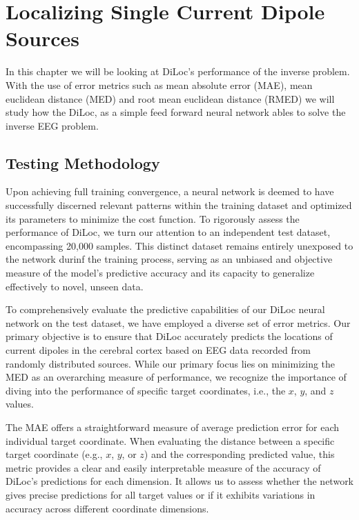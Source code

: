 \documentclass[a4paper, UKenglish, 11pt]{uiomaster}
\begin{document}
\chapter{Localizing Single Current Dipole Sources}

In this chapter we will be looking at DiLoc's performance of the inverse problem. With the use of error metrics such as mean absolute error (MAE), mean euclidean distance (MED) and root mean euclidean distance (RMED) we will study how the DiLoc, as a simple feed forward neural network ables to solve the inverse EEG problem.


\section{Testing Methodology}
Upon achieving full training convergence, a neural network is deemed to have successfully discerned relevant patterns within the training dataset and optimized its parameters to minimize the cost function. To rigorously assess the performance of DiLoc, we turn our attention to an independent test dataset, encompassing 20,000 samples. This distinct dataset remains entirely unexposed to the network durinf the training process, serving as an unbiased and objective measure of the model's predictive accuracy and its capacity to generalize effectively to novel, unseen data.

To comprehensively evaluate the predictive capabilities of our DiLoc neural network on the test dataset, we have employed a diverse set of error metrics. Our primary objective is to ensure that DiLoc accurately predicts the locations of current dipoles in the cerebral cortex based on EEG data recorded from randomly distributed sources. While our primary focus lies on minimizing the MED as an overarching measure of performance, we recognize the importance of diving into the performance of specific target coordinates, i.e., the $x$, $y$, and $z$ values.

The MAE offers a straightforward measure of average prediction error for each individual target coordinate. When evaluating the distance between a specific target coordinate (e.g., $x$, $y$, or $z$) and the corresponding predicted value, this metric provides a clear and easily interpretable measure of the accuracy of DiLoc's predictions for each dimension. It allows us to assess whether the network gives precise predictions for all target values or if it exhibits variations in accuracy across different coordinate dimensions.
\end{document}

